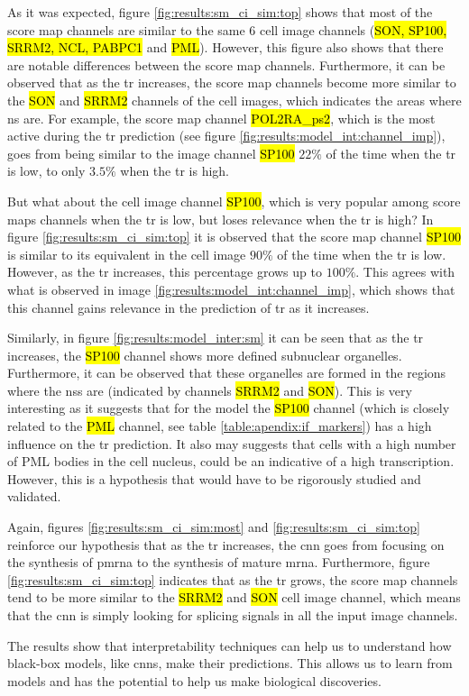 As it was expected, figure \ref{fig:results:sm_ci_sim:top} shows that most of the score map channels are similar to the same 6 cell image channels (\hl{SON, SP100, SRRM2, NCL, PABPC1} and \hl{PML}).
However, this figure also shows that there are notable differences between the score map channels. Furthermore, it can be observed that as the \gls{tr} increases, the score map channels become more similar to the \hl{SON} and \hl{SRRM2} channels of the cell images, which indicates the areas where \gls{ns} are.
For example, the score map channel \hl{POL2RA\_ps2}, which is the most active during the \gls{tr} prediction (see figure \ref{fig:results:model_int:channel_imp}), goes from being similar to the image channel \hl{SP100} $22\%$ of the time when the \gls{tr} is low, to only $3.5\%$ when the \gls{tr} is high.

But what about the cell image channel \hl{SP100}, which is very popular among score maps channels when the \gls{tr} is low, but loses relevance when the \gls{tr} is high?
In figure \ref{fig:results:sm_ci_sim:top} it is observed that the score map channel \hl{SP100} is similar to its equivalent in the cell image $90\%$ of the time when the \gls{tr} is low. However, as the \gls{tr} increases, this percentage grows up to $100\%$.
This agrees with what is observed in image \ref{fig:results:model_int:channel_imp}, which shows that this channel gains relevance in the prediction of \gls{tr} as it increases.

Similarly, in figure \ref{fig:results:model_inter:sm} it can be seen that as the \gls{tr} increases, the \hl{SP100} channel shows more defined subnuclear organelles. Furthermore, it can be observed that these organelles are formed in the regions where the \glspl{ns} are (indicated by channels \hl{SRRM2} and \hl{SON}). This is very interesting as it suggests that for the model the \hl{SP100} channel (which is closely related to the \hl{PML} channel, see table \ref{table:apendix:if_markers}) has a high influence on the \gls{tr} prediction. It also may suggests that cells with a high number of PML bodies in the cell nucleus, could be an indicative of a high transcription. However, this is a hypothesis that would have to be rigorously studied and validated.

Again, figures \ref{fig:results:sm_ci_sim:most} and \ref{fig:results:sm_ci_sim:top} reinforce our hypothesis that as the \gls{tr} increases, the \gls{cnn} goes from focusing on the synthesis of \gls{pmrna} to the synthesis of mature \gls{mrna}.
Furthermore, figure \ref{fig:results:sm_ci_sim:top} indicates that as the \gls{tr} grows, the score map channels tend to be more similar to the \hl{SRRM2} and \hl{SON} cell image channel, which means that the \gls{cnn} is simply looking for splicing signals in all the input image channels.

The results show that interpretability techniques can help us to understand how black-box models, like  \glspl{cnn}, make their predictions. This allows us to learn from models and has the potential to help us make biological discoveries.